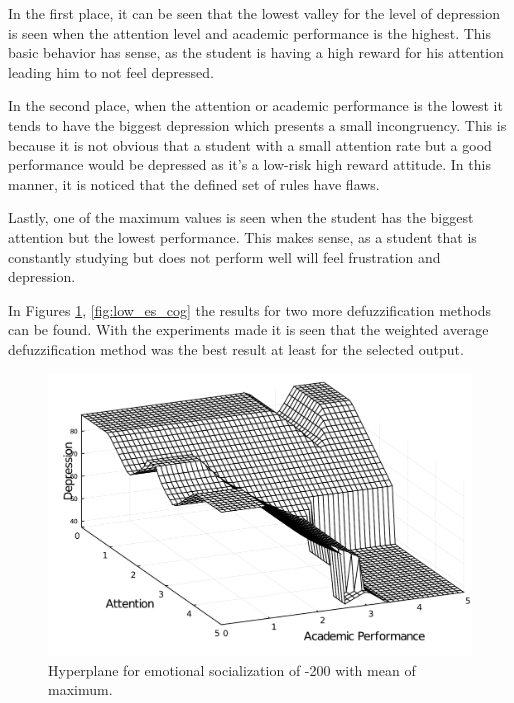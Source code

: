 \documentclass[conference]{IEEEtran}
\theoremstyle{definition}
\theoremstyle{remark}
\theoremstyle{remark}
\begin{document}
In the first place, it can be seen that the lowest valley for the level of
depression is seen when the attention level and academic performance is the
highest. This basic behavior has sense, as the student is having a high reward
for his attention leading him to not feel depressed.

In the second place, when the attention or academic performance is the lowest it
tends to have the biggest depression which presents a small incongruency. This
is because it is not obvious that a student with a small attention rate but a
good performance would be depressed as it's a low-risk high reward attitude. In
this manner, it is noticed that the defined set of rules have flaws.

Lastly, one of the maximum values is seen when the student has the biggest
attention but the lowest performance. This makes sense, as a student that is
constantly studying but does not perform well will feel frustration and
depression.

In Figures \ref{fig:low_es_mom}, \ref{fig:low_es_cog} the results for two more
defuzzification methods can be found. With the experiments made it is seen that
the weighted average defuzzification method was the best result at least for the
selected output.

\begin{figure}[t]
  \centering
  \includegraphics[scale=.3]{figs/low_es_mom}
  \caption{Hyperplane for emotional socialization of -200 with mean of maximum.}
  \label{fig:low_es_mom}
\end{figure}
\end{document}
